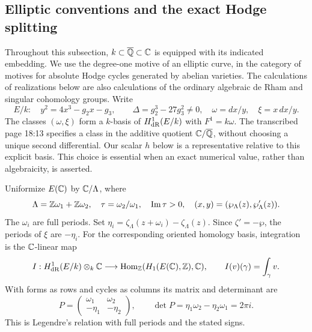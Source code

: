 \subsection{Elliptic conventions and the exact Hodge splitting}

Throughout this subsection, $k\subset\overline{\mathbb Q}\subset\mathbb C$ is equipped with its indicated embedding. We use the degree-one motive of an elliptic curve, in the category of motives for absolute Hodge cycles generated by abelian varieties. The calculations of realizations below are also calculations of the ordinary algebraic de Rham and singular cohomology groups. Write
\[
 E/k:\quad y^2=4x^3-g_2x-g_3,\qquad
 \Delta=g_2^3-27g_3^2\ne0,
 \quad \omega=dx/y,\quad \xi=x\,dx/y.
\]
The classes $(\omega,\xi)$ form a $k$-basis of $H^1_{\mathrm{dR}}(E/k)$ with $F^1=k\omega$. The transcribed page 18:13 specifies a class in the additive quotient $\mathbb C/\overline{\mathbb Q}$, without choosing a unique second differential. Our scalar $h$ below is a representative relative to this explicit basis. This choice is essential when an exact numerical value, rather than algebraicity, is asserted.

Uniformize $E(\mathbb C)$ by $\mathbb C/\Lambda$, where
\[
 \Lambda=\mathbb Z\omega_1+\mathbb Z\omega_2,\quad
 \tau=\omega_2/\omega_1,\quad\operatorname{Im}\tau>0,
 \quad (x,y)=(\wp_\Lambda(z),\wp'_\Lambda(z)).
\]
The $\omega_i$ are full periods. Set $\eta_i=\zeta_\Lambda(z+\omega_i)-\zeta_\Lambda(z)$. Since $\zeta'=-\wp$, the periods of $\xi$ are $-\eta_i$. For the corresponding oriented homology basis, integration is the $\mathbb C$-linear map
\[
 I:H^1_{\mathrm{dR}}(E/k)\otimes_k\mathbb C
 \longrightarrow \operatorname{Hom}_{\mathbb Z}(H_1(E(\mathbb C),\mathbb Z),\mathbb C),
 \qquad I(v)(\gamma)=\int_\gamma v.
\]
With forms as rows and cycles as columns its matrix and determinant are
\begin{equation}\label{ell:periodmatrix}
 P=\begin{pmatrix}\omega_1&\omega_2\\-\eta_1&-\eta_2\end{pmatrix},
 \qquad \det P=\eta_1\omega_2-\eta_2\omega_1=2\pi i.
\end{equation}
This is Legendre's relation with full periods and the stated signs.


